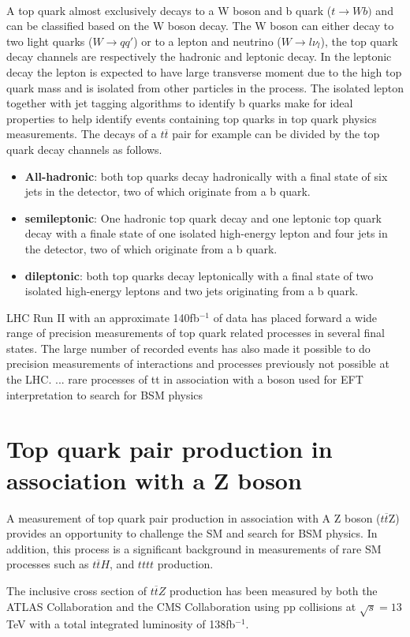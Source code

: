 \\
A top quark almost exclusively decays to a W boson and b quark ($t\to Wb)$ and can be classified based on the W boson decay. The W boson can either decay to two light quarks ($W\to qq'$) or to a lepton and neutrino ($W\to l \nu_l$), the top quark decay channels are respectively the hadronic and leptonic decay. In the leptonic decay the lepton is expected to have large transverse moment due to the high top quark mass and is isolated from other particles in the process. The isolated lepton together with jet tagging algorithms to identify b quarks make for ideal properties to help identify events containing top quarks in top quark physics measurements. The decays of a $t\overline{t}$ pair for example can be divided by the top quark decay channels as follows.
\begin{itemize}
    \item \textbf{All-hadronic}: both top quarks decay hadronically with a final state of six jets in the detector, two of which originate from a b quark.
    \item \textbf{semileptonic}: One hadronic top quark decay and one leptonic top quark decay with a finale state of one isolated high-energy lepton and four jets in the detector, two of which originate from a b quark.
    \item \textbf{dileptonic}: both top quarks decay leptonically with a final state of two isolated high-energy leptons and two jets originating from a b quark.
\end{itemize}
LHC Run II with an approximate 140fb$^{-1}$ of data has placed forward a wide range of precision measurements of top quark related processes in several final states. The large number of recorded events has also made it possible to do precision measurements of interactions and processes previously not possible at the LHC. ... 
rare processes of tt in association with a boson
used for EFT interpretation to search for BSM physics


\section{Top quark pair production in association with a Z boson}
A measurement of top quark pair production in association with A Z boson ($t\overline{t}$Z) provides an opportunity to challenge the SM and search for BSM physics. In addition, this process is a significant background in measurements of rare SM processes such as $t\overline{t}H$, and $tttt$ production. 

The inclusive cross section of $t\overline{t}Z$ production has been measured by both the ATLAS Collaboration and the CMS Collaboration using pp collisions at $\sqrt{s}=13$TeV with a total integrated luminosity of 138fb$^{-1}$.